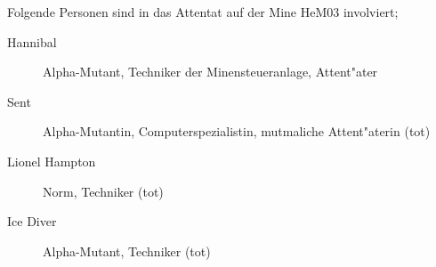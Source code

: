 
Folgende Personen sind in das Attentat auf der Mine HeM03 involviert;

\begin{description}
    \item[Hannibal] Alpha-Mutant, Techniker der Minensteueranlage, Attent"ater
    \item[Sent] Alpha-Mutantin, Computerspezialistin, mutma\3liche Attent"aterin (tot)
    \item[Lionel Hampton] Norm, Techniker (tot)
    \item[Ice Diver] Alpha-Mutant, Techniker (tot) 
\end{description}
